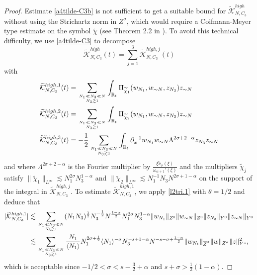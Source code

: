 \documentclass{amsart}
\theoremstyle{definition}
\theoremstyle{remark}
\def\R{{\mathbb R}}
\numberwithin{equation}{section}
\newcommand\cro[1]{\langle #1 \rangle}
\begin{document}
\begin{proof}
Estimate \eqref{a4tilde-C3b} is not sufficient to get a suitable bound for $\widetilde{\mathcal{K}}_{N,C_3}^{high}$ without using the Strichartz norm in $Z^\sigma$, which would require a Coifmann-Meyer type estimate on the symbol $\widetilde{\chi}$ (see Theorem 2.2 in \cite{MPV}). To avoid this technical difficulty, we use \eqref{a4tilde-C3} to  decompose 
\begin{equation*}
 \widetilde{\mathcal{K}}_{N,C_3}^{high}(t) = \sum_{j=1}^3 \widetilde{\mathcal{K}}_{N,C_3}^{high,j}(t)
\end{equation*}
with
\begin{align*}
  \widetilde{\mathcal{K}}_{N,C_3}^{high,1}(t) &= \sum_{N_1\ll N_3\ll N\atop N_3 \gtrsim 1} \int_{\R_t} \Pi_{\widetilde{\chi}_1}(w_{N_1}, w_{\sim N}, z_{N_3})z_{\sim N}  \\ 
    \widetilde{\mathcal{K}}_{N,C_3}^{high,2}(t) &=\sum_{N_1\ll N_3\ll N\atop N_3 \gtrsim 1} \int_{\R_t} \Pi_{\widetilde{\chi}_2}(w_{N_1}, w_{\sim N}, z_{N_3})z_{\sim N} \\
   \widetilde{\mathcal{K}}_{N,C_3}^{high,3}(t) &= - \frac 12 \sum_{N_1\ll N_3\ll N\atop N_3 \gtrsim 1} \int_{\R_t} \partial_x^{-1}w_{N_1} w_{\sim N} \Lambda^{2\sigma+2-\alpha}z_{N_3} z_{\sim N} 
  \end{align*}
    and where $\Lambda^{2\sigma+2-\alpha}$ is the Fourier multiplier by $\frac{\xi \widetilde{\nu}_\sigma(\xi)}{\omega_{\alpha+1}'(\xi)}$ and the multipliers $\widetilde{\chi}_j$ satisfy $\|\widetilde{\chi}_1\|_{L^\infty}\lesssim N_1^{2\sigma}N_3^{1-\alpha}$ and $\|\widetilde{\chi}_2\|_{L^\infty}\lesssim N_1^{-1}N_3N^{2\sigma+1-\alpha}$ on the support of the integral in $\widetilde{\mathcal{K}}_{N,C_3}^{high,j}$. To estimate $\widetilde{\mathcal{K}}_{N,C_3}^{high,1}$, we apply \eqref{l2tri.1} with $\theta=1/2$ and deduce that
\begin{align*}
  |\widetilde{\mathcal{K}}_{N,C_3}^{high,1}| &\lesssim \sum_{N_1\ll N_3\ll N \atop N_3 \gtrsim 1} (N_1N_3)^{\frac 12} N_3^{-\frac 12}N^{\frac{1-\alpha}2} N_1^{2\sigma}N_3^{1-\alpha} \|w_{N_1}\|_{Z^0} \|w_{\sim N}\|_{Z^0} \|z_{N_3}\|_{Y^0} \|z_{\sim N}\|_{Y^0}\\
  &\lesssim \sum_{N_1\ll N_3\ll N \atop N_3 \gtrsim 1} \frac{N_1}{\cro{N_1}} N_1^{2\sigma+\frac 12} \cro{N_1}^{-\sigma}N_3^{-s+1-\alpha}N^{-s-\sigma+\frac{1-\alpha}2} \|w_{N_1}\|_{\overline{Z}^\sigma} \|w\|_{Z^\sigma} \|z\|_{Y^s}^2,
\end{align*}
which is acceptable since   $-1/2<\sigma<s-\frac{3}{2}+\alpha $ and $s+\sigma > \frac 12(1-\alpha)$.


\end{proof}
\end{document}
